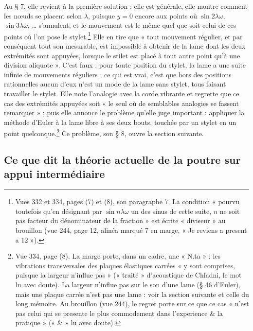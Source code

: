 \documentclass[11pt,a4paper]{article}
\begin{document}
Au § 7, elle revient à la première solution : elle est générale, elle montre comment les nœuds se placent selon $\lambda$, puisque $y=0$ encore aux points où $\sin2\lambda\omega$, $\sin3\lambda\omega$, … s'annulent, et le mouvement est le même quel que soit celui de ces points où l'on pose le stylet.\footnote{Vues 332 et 334, pages (7) et (8), son paragraphe 7. La condition « pourvu toutefois qu'en désignant par $\sin n\lambda\omega$ un des sinus de cette suite, $n$ ne soit pas facteur du dénominateur de la fraction » est écrite « diviseur » au brouillon (vue 244, page 12, alinéa marqué 7 en marge, « Je reviens a present a 12 »).} Elle en tire que « tout mouvement régulier, et par conséquent tout son mesurable, est impossible à obtenir de la lame dont les deux extrémités sont appuyées, lorsque le stilet est placé à tout autre point qu'à une division aliquote ». C'est faux : pour toute position du stylet, la lame a une suite infinie de mouvements réguliers ; ce qui est vrai, c'est que hors des positions rationnelles aucun d'eux n'est un mode de la lame sans stylet, tous faisant travailler le stylet. Elle note l'analogie avec la corde vibrante et regrette que ce cas des extrémités appuyées soit « le seul où de semblables analogies se fassent remarquer » ; puis elle annonce le problème qu'elle juge important : appliquer la méthode d'Euler à la lame libre à ses deux bouts, touchée par un stylet en un point quelconque.\footnote{Vue 334, page (8). La marge porte, dans un cadre, une « N.ta » : les vibrations transversales des plaques élastiques carrées « y sont comprises, puisque la largeur n'influe pas » (« traité » d'acoustique de Chladni, le mot lu avec doute). La largeur n'influe pas sur le son d'une lame (§ 46 d'Euler), mais une plaque carrée n'est pas une lame : voir la section suivante et celle du long mémoire. Au brouillon (vue 244), le regret porte sur ce que ce cas « n'est pas celui qui se presente le plus commodement dans l'experience \& la pratique » (« \& » lu avec doute).} Ce problème, son § 8, ouvre la section suivante.

\subsection*{Ce que dit la théorie actuelle de la poutre sur appui intermédiaire}
\end{document}
